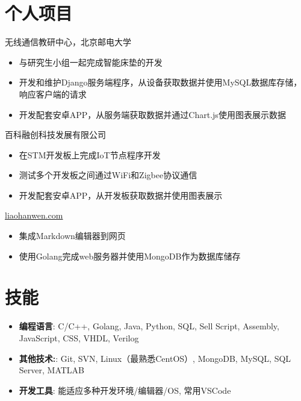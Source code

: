 \documentclass{resume}
\begin{document}
\vspace{6pt}

\section{个人项目}
无线通信教研中心，北京邮电大学
\begin{itemize}[parsep=0.25ex]
    \item 与研究生小组一起完成智能床垫的开发
    \item 开发和维护Django服务端程序，从设备获取数据并使用MySQL数据库存储，响应客户端的请求
    \item 开发配套安卓APP，从服务端获取数据并通过Chart.js使用图表展示数据
\end{itemize}
百科融创科技发展有限公司
\begin{itemize}[parsep=0.25ex]
    \item 在STM开发板上完成IoT节点程序开发
    \item 测试多个开发板之间通过WiFi和Zigbee协议通信
    \item 开发配套安卓APP，从开发板获取数据并使用图表展示
\end{itemize}
\href{https://liaohanwen.com}{liaohanwen.com}
\begin{itemize}[parsep=0.25ex]
    \item 集成Markdown编辑器到网页
    \item 使用Golang完成web服务器并使用MongoDB作为数据库储存
\end{itemize}

\vspace{6pt}

\section{技能}
\begin{itemize}[parsep=0.25ex]
    \item
          \textbf{编程语言}:
          C/C++, Golang, Java, Python, SQL, Sell Script, Assembly, JavaScript, CSS, VHDL, Verilog 
    \item
          \textbf{其他技术:}:
          Git, SVN, Linux（最熟悉CentOS）, MongoDB, MySQL, SQL Server, MATLAB
    \item
          \textbf{开发工具}:
          能适应多种开发环境/编辑器/OS, 常用VSCode
\end{itemize}
\end{document}
